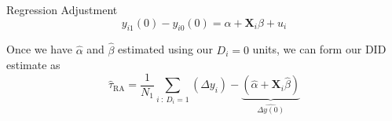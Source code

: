 \documentclass[aspectratio=169,t,11pt,table]{beamer}
\begin{document}
\begin{frame}{Regression Adjustment}
  \vspace*{-\bigskipamount}
  $$
    y_{i1}(0) - y_{i0}(0) = \alpha + \bm{X}_i \beta + u_i
  $$
  
  \bigskip
  Once we have $\hat{\alpha}$ and $\hat{\beta}$ estimated using our $D_i = 0$ units, we can form our DID estimate as 
  $$
    \hat{\tau}_{\text{RA}} = \frac{1}{N_1} \sum_{i \ : \ D_i = 1} \left( \Delta y_i \right) - \underbrace{ (\hat{\alpha} + \bm{X}_i \hat{\beta}) }_{\widehat{\Delta y(0)}}
  $$
\end{frame}







% 
%     
% 







\end{document}
